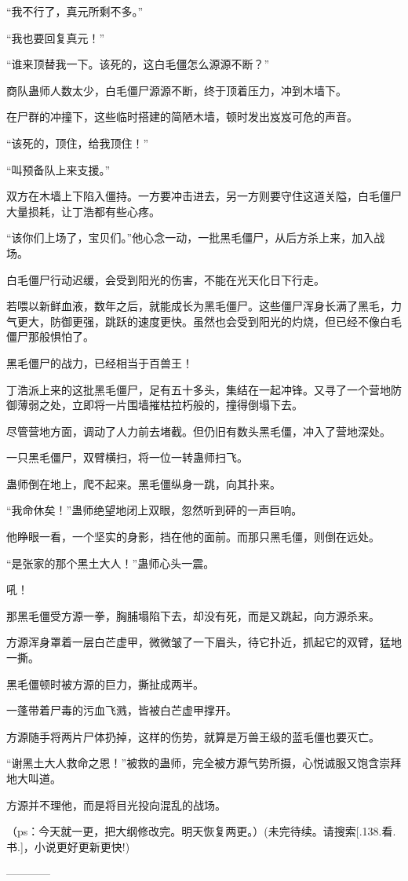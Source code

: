 \begin{this_body}
“我不行了，真元所剩不多。”

“我也要回复真元！”

“谁来顶替我一下。该死的，这白毛僵怎么源源不断？”

商队蛊师人数太少，白毛僵尸源源不断，终于顶着压力，冲到木墙下。

在尸群的冲撞下，这些临时搭建的简陋木墙，顿时发出岌岌可危的声音。

“该死的，顶住，给我顶住！”

“叫预备队上来支援。”

双方在木墙上下陷入僵持。一方要冲击进去，另一方则要守住这道关隘，白毛僵尸大量损耗，让丁浩都有些心疼。

“该你们上场了，宝贝们。”他心念一动，一批黑毛僵尸，从后方杀上来，加入战场。

白毛僵尸行动迟缓，会受到阳光的伤害，不能在光天化日下行走。

若喂以新鲜血液，数年之后，就能成长为黑毛僵尸。这些僵尸浑身长满了黑毛，力气更大，防御更强，跳跃的速度更快。虽然也会受到阳光的灼烧，但已经不像白毛僵尸那般惧怕了。

黑毛僵尸的战力，已经相当于百兽王！

丁浩派上来的这批黑毛僵尸，足有五十多头，集结在一起冲锋。又寻了一个营地防御薄弱之处，立即将一片围墙摧枯拉朽般的，撞得倒塌下去。

尽管营地方面，调动了人力前去堵截。但仍旧有数头黑毛僵，冲入了营地深处。

一只黑毛僵尸，双臂横扫，将一位一转蛊师扫飞。

蛊师倒在地上，爬不起来。黑毛僵纵身一跳，向其扑来。

“我命休矣！”蛊师绝望地闭上双眼，忽然听到砰的一声巨响。

他睁眼一看，一个坚实的身影，挡在他的面前。而那只黑毛僵，则倒在远处。

“是张家的那个黑土大人！”蛊师心头一震。

吼！

那黑毛僵受方源一拳，胸脯塌陷下去，却没有死，而是又跳起，向方源杀来。

方源浑身罩着一层白芒虚甲，微微皱了一下眉头，待它扑近，抓起它的双臂，猛地一撕。

黑毛僵顿时被方源的巨力，撕扯成两半。

一蓬带着尸毒的污血飞溅，皆被白芒虚甲撑开。

方源随手将两片尸体扔掉，这样的伤势，就算是万兽王级的蓝毛僵也要灭亡。

“谢黑土大人救命之恩！”被救的蛊师，完全被方源气势所摄，心悦诚服又饱含崇拜地大叫道。

方源并不理他，而是将目光投向混乱的战场。

（ps：今天就一更，把大纲修改完。明天恢复两更。）(未完待续。请搜索[.138.看.书.]，小说更好更新更快!)

------------

\end{this_body}

